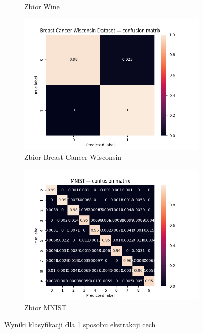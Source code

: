 \documentclass[10pt]{article}
\begin{document}
\begin{figure}[H]
\begin{subfigure}[t]{0.3\textwidth}
        \caption{Zbior Wine}
    \end{subfigure}
    \hfill
    \begin{subfigure}[t]{0.3\textwidth}
        \includegraphics[width=\linewidth]{img/cancer_cm.png}
        \caption{Zbior Breast Cancer Wisconsin}
    \end{subfigure}
    \begin{subfigure}[t]{0.5\textwidth}
        \includegraphics[width=\linewidth]{img/mnist_flat_cm.png}
        \caption{Zbior MNIST}
    \end{subfigure}
    \caption{Wyniki klasyfikacji dla 1 sposobu ekstrakcji cech}
\end{figure}
\end{document}
